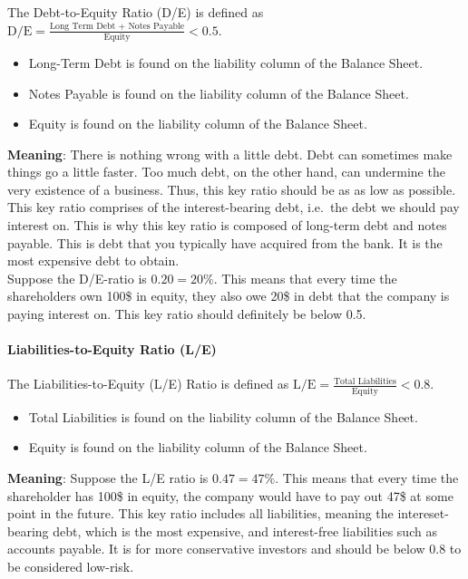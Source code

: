 The Debt-to-Equity Ratio (D/E) is defined as
$\text{D/E} = \frac{\text{Long Term Debt + Notes Payable}}{\text{Equity}} < 0.5$.
\begin{itemize}
    \item Long-Term Debt is found on the liability column of the Balance Sheet.
    \item Notes Payable is found on the liability column of the Balance Sheet.
    \item Equity is found on the liability column of the Balance Sheet.
\end{itemize}
\textbf{Meaning}: There is nothing wrong with a little debt. Debt can sometimes
make things go a little faster. Too much debt, on the other hand, can undermine
the very existence of a business. Thus, this key ratio should be as as low as
possible. This key ratio comprises of the interest-bearing debt, i.e.\ the debt
we should pay interest on. This is why this key ratio is composed of long-term
debt and notes payable. This is debt that you typically have acquired from the
bank. It is the most expensive debt to obtain.\\
Suppose the D/E-ratio is $0.20 = 20\%$. This means that every time the shareholders
own 100\$ in equity, they also owe 20\$ in debt that the company is paying interest
on. This key ratio should definitely be below 0.5.

\paragraph{Liabilities-to-Equity Ratio (L/E)}

The Liabilities-to-Equity (L/E) Ratio is defined as
$\text{L/E} = \frac{\text{Total Liabilities}}{\text{Equity}} < 0.8$.
\begin{itemize}
    \item Total Liabilities is found on the liability column of the Balance Sheet.
    \item Equity is found on the liability column of the Balance Sheet.
\end{itemize}
\textbf{Meaning}: Suppose the L/E ratio is $0.47 = 47\%$. This means that every
time the shareholder has 100\$ in equity, the company would have to pay out 47\$
at some point in the future. This key ratio includes all liabilities, meaning the
intereset-bearing debt, which is the most expensive, and interest-free liabilities
such as accounts payable. It is for more conservative investors and should be
below 0.8 to be considered low-risk.

